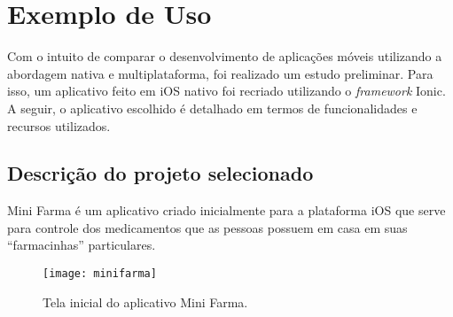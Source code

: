 \chapter{Exemplo de Uso} \label{cap:estudodecaso}
Com o intuito de comparar o desenvolvimento de aplicações móveis utilizando a abordagem nativa e multiplataforma, 
foi realizado um estudo preliminar. Para isso, um aplicativo feito em iOS 
nativo foi recriado utilizando o \textit{framework} Ionic. A seguir, o aplicativo escolhido é detalhado em termos de funcionalidades e recursos utilizados. 

\section{Descrição do projeto selecionado} \label{sec:descricaodoprojeto}

Mini Farma é um aplicativo criado inicialmente para a plataforma iOS que serve para controle dos medicamentos que as 
pessoas possuem em casa em suas ``farmacinhas'' particulares.

\begin{figure}[h]
  \centering
    \texttt{[image: minifarma]}
    \caption[Tela inicial do aplicativo Mini Farma]{ Tela inicial do aplicativo Mini Farma.}
	\label{fig:minifarma}
\end{figure}

